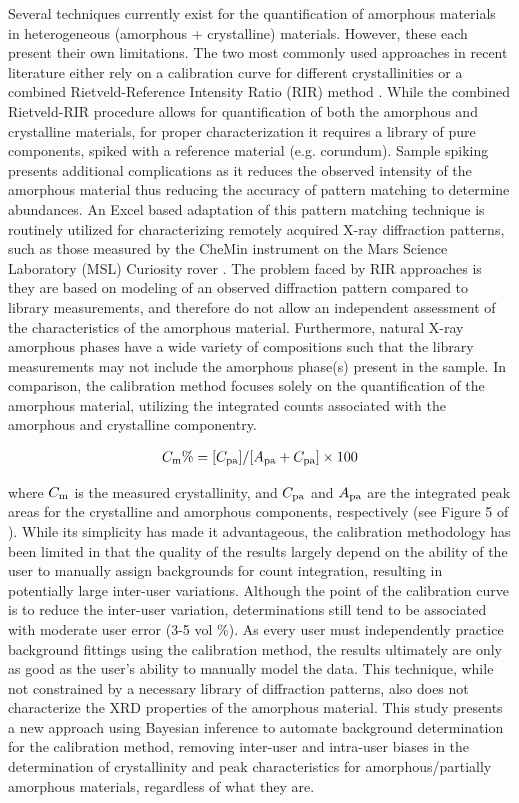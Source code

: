 \documentclass[review]{elsarticle}
\begin{document}
Several techniques currently exist for the quantification of amorphous materials in heterogeneous (amorphous + crystalline) materials. However, these
each present their own limitations. The two most commonly used approaches in recent literature
either rely on a calibration curve for different crystallinities \citep[calibration method;][]{ rowe2012} or a combined Rietveld-Reference Intensity Ratio (RIR) method \citep{gualtieri1996, gualtieri2000}. While the combined Rietveld-RIR procedure allows for quantification of both the amorphous 
and crystalline materials, for proper characterization it requires a library of pure components,
spiked with a reference material (e.g. corundum). Sample spiking presents additional complications
as it reduces the observed intensity of the amorphous material thus reducing the accuracy of
pattern matching to determine abundances. An Excel based adaptation of this pattern matching
technique \citep[FULLPAT;][]{chipera2002} is routinely utilized for characterizing remotely acquired X-ray
diffraction patterns, such as those measured by the CheMin instrument on the Mars Science Laboratory (MSL) Curiosity rover \citep{blake2012, bish2013}. The problem faced by RIR approaches is they are based on modeling of an observed 
diffraction pattern compared to library measurements, and therefore do not allow an independent
assessment of the characteristics of the amorphous material. Furthermore, natural X-ray amorphous phases have a wide variety of compositions such that the library measurements may not include the amorphous phase(s) present in the sample. In comparison, the calibration method
focuses solely on the quantification of the amorphous material, utilizing the integrated counts
associated with the amorphous and crystalline componentry. 

\begin{align}
C_{\rm m} \% = [C_{\rm pa}]/[A_{\rm pa} + C_{\rm pa}] \times 100
\end{align}

where $C_{\rm m}$ is the measured crystallinity, and $C_{\rm pa}$ and $A_{\rm pa}$ are the integrated peak areas for the
crystalline and amorphous components, respectively (see Figure 5 of \citet{wall2014}). 
While its simplicity has made it advantageous, the calibration methodology has been limited in that
the quality of the results largely depend on the ability of the user to manually assign
backgrounds for count integration, resulting in potentially large inter-user variations. Although the
point of the calibration curve is to reduce the inter-user variation, determinations still tend to
be associated with moderate user error (3-5 vol \%). As every user must independently practice
background fittings using the calibration method, the results ultimately are only as good as the
user’s ability to manually model the data. This technique, while not constrained by a
necessary library of diffraction patterns, also does not characterize the XRD properties of the
amorphous material. This study presents a new approach using Bayesian inference to automate
background determination for the calibration method, removing inter-user and intra-user biases in
the determination of crystallinity and peak characteristics for amorphous/partially amorphous
materials, regardless of what they are. 
\end{document}
